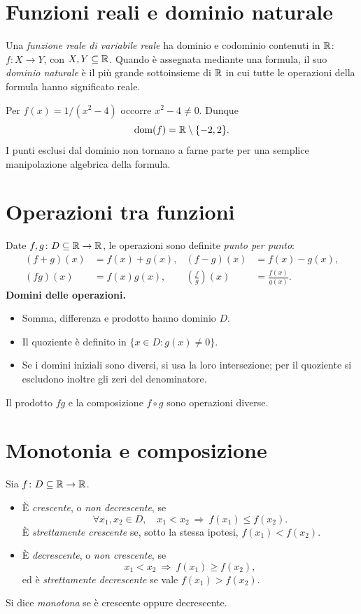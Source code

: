 \section{Funzioni reali e dominio naturale}

Una \emph{funzione reale di variabile reale} ha dominio e codominio contenuti in $\mathbb{R}$: $f\colon X\to Y$, con $X,Y\subseteq\mathbb{R}$. Quando è assegnata mediante una formula, il suo \emph{dominio naturale} è il più grande sottoinsieme di $\mathbb{R}$ in cui tutte le operazioni della formula hanno significato reale.

\begin{esempio}
Per $f(x)=1/(x^2-4)$ occorre $x^2-4\ne0$. Dunque
\[
\operatorname{dom}(f)=\mathbb{R}\setminus\{-2,2\}.
\]
I punti esclusi dal dominio non tornano a farne parte per una semplice manipolazione algebrica della formula.
\end{esempio}

\section{Operazioni tra funzioni}

Date $f,g\colon D\subseteq\mathbb{R}\to\mathbb{R}$, le operazioni sono definite \emph{punto per punto}:
\[
\begin{aligned}
(f+g)(x)&=f(x)+g(x), & (f-g)(x)&=f(x)-g(x),\\
(fg)(x)&=f(x)g(x), & \left(\frac fg\right)(x)&=\frac{f(x)}{g(x)}.
\end{aligned}
\]
\textbf{Domini delle operazioni.}
\begin{itemize}
  \item Somma, differenza e prodotto hanno dominio $D$.
  \item Il quoziente è definito in $\{x\in D:g(x)\ne0\}$.
  \item Se i domini iniziali sono diversi, si usa la loro intersezione; per il quoziente si escludono inoltre gli zeri del denominatore.
\end{itemize}
Il prodotto $fg$ e la composizione $f\circ g$ sono operazioni diverse.

\section{Monotonia e composizione}

\begin{definizione}
Sia $f\colon D\subseteq\mathbb{R}\to\mathbb{R}$.
\begin{itemize}
  \item È \emph{crescente}, o \emph{non decrescente}, se
\[
\forall x_1,x_2\in D,\quad x_1<x_2\ \Longrightarrow\ f(x_1)\le f(x_2).
\]
È \emph{strettamente crescente} se, sotto la stessa ipotesi, $f(x_1)<f(x_2)$.
  \item È \emph{decrescente}, o \emph{non crescente}, se
\[
x_1<x_2\ \Longrightarrow\ f(x_1)\ge f(x_2),
\]
ed è \emph{strettamente decrescente} se vale $f(x_1)>f(x_2)$.
\end{itemize}
Si dice \emph{monotona} se è crescente oppure decrescente.
\end{definizione}

